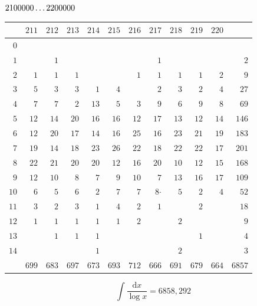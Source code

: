 \par\medskip
\noindent\begin{minipage}{\linewidth}\centering
{}
\(2100000\mathinner{.\,.\,.}2200000\)\par\smallskip
\begingroup\fontsize{10.5}{11.5}\selectfont\setlength{\tabcolsep}{3.5pt}\renewcommand{\arraystretch}{1}
\begin{tabular}{r|rrrrrrrrrr|r}\hline
 & $211$ & $212$ & $213$ & $214$ & $215$ & $216$ & $217$ & $218$ & $219$ & $220$ &  \\ \hline
$0$ &  &  &  &  &  &  &  &  &  &  &  \\
$1$ &  & $1$ &  &  &  &  & $1$ &  &  &  & $2$ \\
$2$ & $1$ & $1$ & $1$ &  &  & $1$ & $1$ & $1$ & $1$ & $2$ & $9$ \\
$3$ & $5$ & $3$ & $3$ & $1$ & $4$ &  & $2$ & $3$ & $2$ & $4$ & $27$ \\
$4$ & $7$ & $7$ & $2$ & $13$ & $5$ & $3$ & $9$ & $6$ & $9$ & $8$ & $69$ \\
$5$ & $12$ & $14$ & $20$ & $16$ & $16$ & $12$ & $17$ & $13$ & $12$ & $14$ & $146$ \\
$6$ & $12$ & $20$ & $17$ & $14$ & $16$ & $25$ & $16$ & $23$ & $21$ & $19$ & $183$ \\
$7$ & $19$ & $14$ & $18$ & $23$ & $26$ & $22$ & $18$ & $22$ & $22$ & $17$ & $201$ \\
$8$ & $22$ & $21$ & $20$ & $20$ & $12$ & $16$ & $20$ & $10$ & $12$ & $15$ & $168$ \\
$9$ & $12$ & $10$ & $8$ & $7$ & $9$ & $10$ & $7$ & $13$ & $16$ & $17$ & $109$ \\
$10$ & $6$ & $5$ & $6$ & $2$ & $7$ & $7$ & $8\mathord{\cdot}$ & $5$ & $2$ & $4$ & $52$ \\
$11$ & $3$ & $2$ & $3$ & $1$ & $4$ & $2$ & $1$ &  & $2$ &  & $18$ \\
$12$ & $1$ & $1$ & $1$ & $1$ & $1$ & $2$ &  & $2$ &  &  & $9$ \\
$13$ &  & $1$ & $1$ & $1$ &  &  &  &  & $1$ &  & $4$ \\
$14$ &  &  &  & $1$ &  &  &  & $2$ &  &  & $3$ \\
\hline
 & $699$ & $683$ & $697$ & $673$ & $693$ & $712$ & $666$ & $691$ & $679$ & $664$ & $6857$ \\ \hline
\end{tabular}\par\endgroup
\setlength{\abovedisplayskip}{6pt}\setlength{\belowdisplayskip}{4pt}
\[\int\frac{\mathrm{d}x}{\log x}=6858{,}292\]
\end{minipage}
